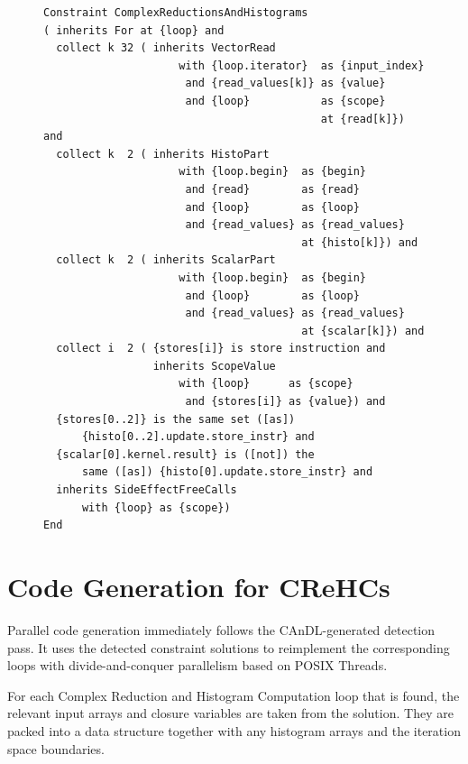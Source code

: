 \begin{figure}[p]
\begin{lstlisting}[language=IDL,label={IDLcomplexred},caption=
   {Complex Reduction and Histogram Computations (CReHCs) as IDL specification:
    The idiom comprises histogram (lines 8--13) and scalar (lines 14--18) reductions contained in a for-loop (line 2).
    These computations accumulate the values from the input array (lines 3--7).
    Additional conditions guarantee the absence of any further side effects in the loop (lines 19--28).}]
Constraint ComplexReductionsAndHistograms
( inherits For at {loop} and
  collect k 32 ( inherits VectorRead
                     with {loop.iterator}  as {input_index}
                      and {read_values[k]} as {value}
                      and {loop}           as {scope}
                                           at {read[k]}) and
  collect k  2 ( inherits HistoPart
                     with {loop.begin}  as {begin}
                      and {read}        as {read}
                      and {loop}        as {loop}
                      and {read_values} as {read_values}
                                        at {histo[k]}) and
  collect k  2 ( inherits ScalarPart
                     with {loop.begin}  as {begin}
                      and {loop}        as {loop}
                      and {read_values} as {read_values}
                                        at {scalar[k]}) and
  collect i  2 ( {stores[i]} is store instruction and
                 inherits ScopeValue
                     with {loop}      as {scope}
                      and {stores[i]} as {value}) and
  {stores[0..2]} is the same set ([as])
      {histo[0..2].update.store_instr} and
  {scalar[0].kernel.result} is ([not]) the
      same ([as]) {histo[0].update.store_instr} and
  inherits SideEffectFreeCalls
      with {loop} as {scope})
End
\end{lstlisting}
\end{figure}

\section{Code Generation for CReHCs}

    Parallel code generation immediately follows the CAnDL-generated detection
    pass.
    It uses the detected constraint solutions to reimplement the corresponding
    loops with divide-and-conquer parallelism based on POSIX Threads.

    For each Complex Reduction and Histogram Computation loop that is found, the
    relevant input arrays and closure variables are taken from the solution.
    They are packed into a data structure together with any histogram arrays
    and the iteration space boundaries.

